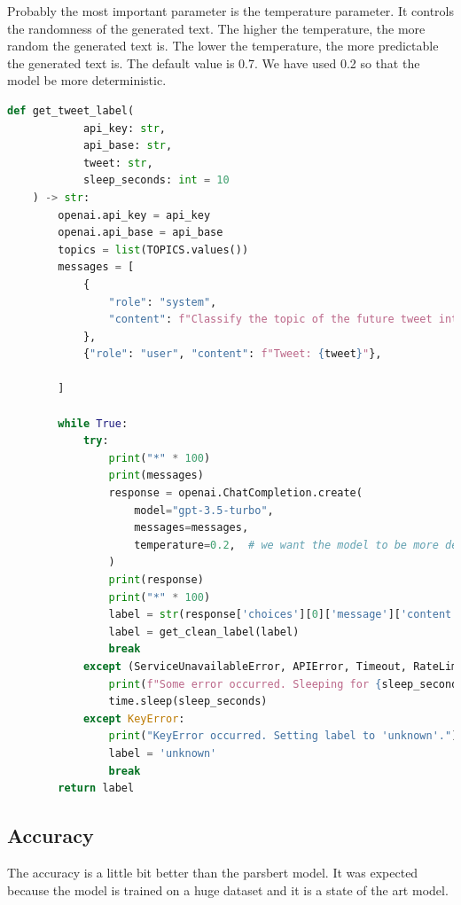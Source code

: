 \documentclass[12pt, letterpaper]{article}
\def\rootDir{../..}
\begin{document}
    Probably the most important parameter is the temperature parameter. It controls the randomness of the generated text. The higher the temperature, the more random the generated text is. The lower the temperature, the more predictable the generated text is. The default value is 0.7. We have used 0.2 so that the model be more deterministic.
    \begin{lstlisting}[language=Python]
    def get_tweet_label(
            api_key: str,
            api_base: str,
            tweet: str,
            sleep_seconds: int = 10
    ) -> str:
        openai.api_key = api_key
        openai.api_base = api_base
        topics = list(TOPICS.values())
        messages = [
            {
                "role": "system",
                "content": f"Classify the topic of the future tweet into only one of the following categories: {', '.join(topics)}. some of these tweets are in slang persian language. please try to understand them. Just type the topic and nothing else."
            },
            {"role": "user", "content": f"Tweet: {tweet}"},
    
        ]
    
        while True:
            try:
                print("*" * 100)
                print(messages)
                response = openai.ChatCompletion.create(
                    model="gpt-3.5-turbo",
                    messages=messages,
                    temperature=0.2,  # we want the model to be more deterministic
                )
                print(response)
                print("*" * 100)
                label = str(response['choices'][0]['message']['content']).strip()
                label = get_clean_label(label)
                break
            except (ServiceUnavailableError, APIError, Timeout, RateLimitError):
                print(f"Some error occurred. Sleeping for {sleep_seconds} seconds and trying again")
                time.sleep(sleep_seconds)
            except KeyError:
                print("KeyError occurred. Setting label to 'unknown'.")
                label = 'unknown'
                break
        return label
    \end{lstlisting}

    \subsection{Accuracy}\label{subsec:accuracy-openai}
    \begin{center}
        \csvautotabular{\rootDir/stats/openai_test_results.csv}
    \end{center}
    The accuracy is a little bit better than the parsbert model. It was expected because the model is trained on a huge dataset and it is a state of the art model.
\end{document}
